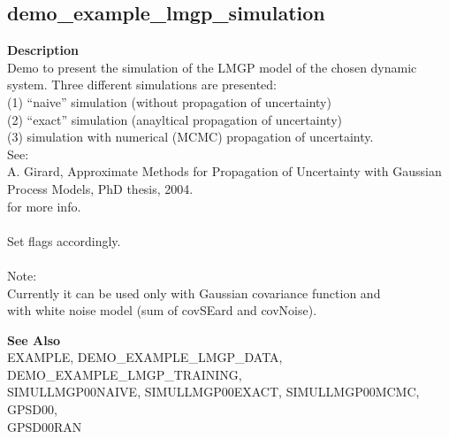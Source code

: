 \subsection*{demo\_example\_lmgp\_simulation} \label{fun:demo_example_lmgp_simulation}

\textbf{Description}
\\ Demo to present the simulation of the LMGP model of the chosen dynamic
 system. Three different simulations are presented:
\\ (1) ``naive'' simulation (without propagation of uncertainty)
\\ (2) ``exact'' simulation (anayltical propagation of uncertainty)
\\ (3) simulation with numerical (MCMC) propagation of uncertainty.
\\ See:
\\   A. Girard, Approximate Methods for Propagation of Uncertainty
   with Gaussian Process Models, PhD thesis, 2004.
\\ for more info.
\\
\\ Set flags accordingly.
\\
\\ Note:
\\ Currently it can be used only with Gaussian covariance function and
\\ with white noise model (sum of covSEard and covNoise).

\textbf{See Also}
\\ EXAMPLE, DEMO\_EXAMPLE\_LMGP\_DATA, DEMO\_EXAMPLE\_LMGP\_TRAINING,
\\ SIMULLMGP00NAIVE, SIMULLMGP00EXACT, SIMULLMGP00MCMC, GPSD00,
\\ GPSD00RAN
